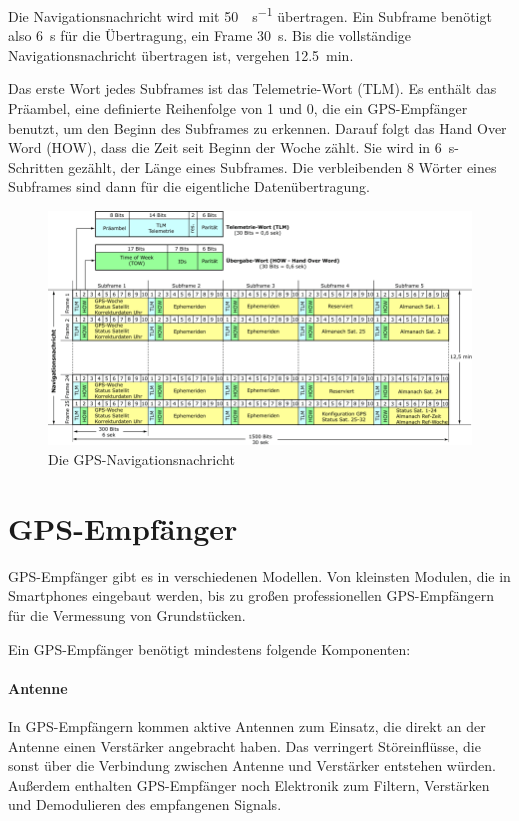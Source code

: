 \documentclass[12pt,a4paper]{scrartcl}
\begin{document}
Die Navigationsnachricht wird mit \SI{50}{\bit\per\second} übertragen.
Ein Subframe benötigt also \SI{6}{\second} für die Übertragung, ein Frame \SI{30}{\second}. Bis die vollständige Navigationsnachricht übertragen ist, vergehen \SI{12.5}{\minute}.

Das erste Wort jedes Subframes ist das Telemetrie-Wort (TLM). Es enthält das Präambel, eine definierte Reihenfolge von 1 und 0, die ein GPS-Empfänger benutzt, um den Beginn des Subframes zu erkennen.  Darauf folgt das Hand Over Word (HOW), dass die Zeit seit Beginn der Woche zählt. Sie wird in \SI{6}{\second}-Schritten gezählt, der Länge eines Subframes. Die verbleibenden 8 Wörter eines Subframes sind dann für die eigentliche Datenübertragung.

\begin{figure}[H]
\centering
\includegraphics[width=\textwidth]{img/navigation_message.png}
\caption{Die GPS-Navigationsnachricht\cite{infotip_gps}}
\label{fig:nm}
\end{figure}

\section{GPS-Empfänger}
GPS-Empfänger gibt es in verschiedenen Modellen. Von kleinsten Modulen, die in Smartphones eingebaut werden, bis zu großen professionellen GPS-Empfängern für die Vermessung von Grundstücken.

Ein GPS-Empfänger benötigt mindestens folgende Komponenten:

\paragraph{Antenne}
In GPS-Empfängern kommen aktive Antennen zum Einsatz, die direkt an der Antenne einen Verstärker angebracht haben. Das verringert Störeinflüsse, die sonst über die Verbindung zwischen Antenne und Verstärker entstehen würden. Außerdem enthalten GPS-Empfänger noch Elektronik zum Filtern, Verstärken und Demodulieren des empfangenen Signals.
\end{document}
